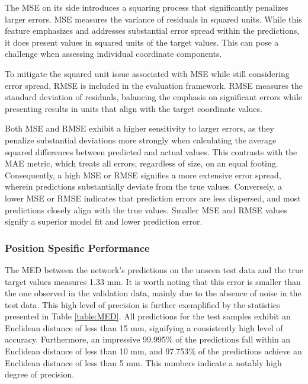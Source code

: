 \documentclass[a4paper, UKenglish, 11pt]{uiomaster}
\begin{document}
The MSE on its side introduces a squaring process that significantly penalizes larger errors. MSE measures the variance of residuals in squared units. While this feature emphasizes and addresses substantial error spread within the predictions, it does present values in squared units of the target values. This can pose a challenge when assessing individual coordinate components.

To mitigate the squared unit issue associated with MSE while still considering error spread, RMSE is included in the evaluation framework. RMSE measures the standard deviation of residuals, balancing the emphasis on significant errors while presenting results in units that align with the target coordinate values.

Both MSE and RMSE exhibit a higher sensitivity to larger errors, as they penalize substantial deviations more strongly when calculating the average squared differences between predicted and actual values. This contrasts with the MAE metric, which treats all errors, regardless of size, on an equal footing. Consequently, a high MSE or RMSE signifies a more extensive error spread, wherein predictions substantially deviate from the true values. Conversely, a lower MSE or RMSE indicates that prediction errors are less dispersed, and most predictions closely align with the true values. Smaller MSE and RMSE values signify a superior model fit and lower prediction error.


\subsubsection{Position Spesific Performance}
The MED between the network's predictions on the unseen test data and the true target values measures 1.33 mm. It is worth noting that this error is smaller than the one observed in the validation data, mainly due to the absence of noise in the test data. This high level of precision is further exemplified by the statistics presented in Table \ref{table:MED}. All predictions for the test samples exhibit an Euclidean distance of less than 15 mm, signifying a consistently high level of accuracy. Furthermore, an impressive 99.995$\%$ of the predictions fall within an Euclidean distance of less than 10 mm, and 97.753$\%$ of the predictions achieve an Euclidean distance of less than 5 mm. This numbers indicate a notably high degree of precision.
\end{document}
